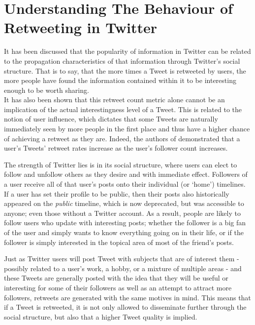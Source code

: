 \chapter{Understanding The Behaviour of Retweeting in Twitter}


It has been discussed that the popularity of information in Twitter can be related to the propagation characteristics of that information through Twitter's social structure. That is to say, that the more times a Tweet is retweeted by users, the more people have found the information contained within it to be interesting enough to be worth sharing.\\
It has also been shown that this retweet count metric alone cannot be an implication of the actual interestingness level of a Tweet. This is related to the notion of user influence, which dictates that some Tweets are naturally immediately seen by more people in the first place and thus have a higher chance of achieving a retweet as they are. Indeed, the authors of \cite{suh10} demonstrated that a user's Tweets' retweet rates increase as the user's follower count increases.

The strength of Twitter lies is in its social structure, where users can elect to follow and unfollow others as they desire and with immediate effect. Followers of a user receive all of that user's posts onto their individual (or `home') timelines. If a user has set their profile to be public, then their posts also historically appeared on the \textit{public} timeline, which is now deprecated, but was accessible to anyone; even those without a Twitter account. As a result, people are likely to follow users who update with interesting posts; whether the follower is a big fan of the user and simply wants to know everything going on in their life, or if the follower is simply interested in the topical area of most of the friend's posts. 

Just as Twitter users will post Tweet with subjects that are of interest them - possibly related to a user's work, a hobby, or a mixture of multiple areas - and these Tweets are generally posted with the idea that they will be useful or interesting for some of their followers as well as an attempt to attract more followers, retweets are generated with the same motives in mind. This means that if a Tweet is retweeted, it is not only allowed to disseminate further through the social structure, but also that a higher Tweet quality is implied.

